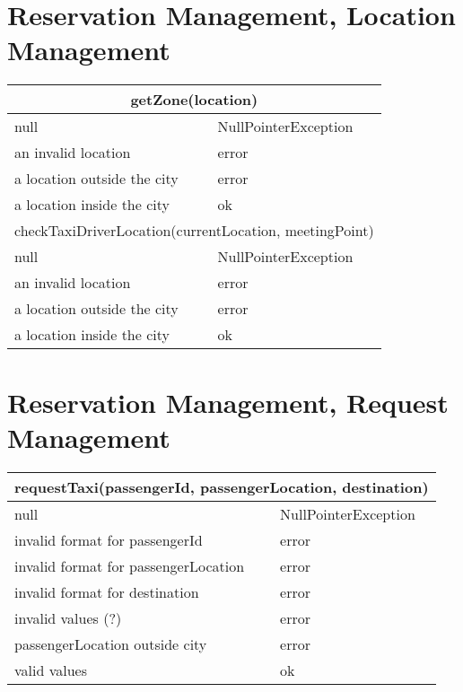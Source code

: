 \documentclass[11pt,oneside,a4paper]{report}
\begin{document}
\section{Reservation Management, Location Management}
\begin{tabular}{p{5cm}|p{6cm}}
\hline
	\multicolumn{2}{c}{getZone(location)}\\\hline
	null &
	NullPointerException \\\hline
	an invalid location &
	error \\\hline
	a location outside the city &
	error \\\hline
	a location inside the city &
	ok \\\hline\hline
		
	\multicolumn{2}{c}{	checkTaxiDriverLocation(currentLocation, meetingPoint)}\\\hline
	null &
	NullPointerException \\\hline
	an invalid location &
	error \\\hline
	a location outside the city &
	error \\\hline
	a location inside the city &
	ok \\\hline
\end{tabular}


\section{Reservation Management, Request Management}
\begin{tabular}{p{5cm}|p{6cm}}
\hline
	\multicolumn{2}{c}{requestTaxi(passengerId, passengerLocation, destination)}\\\hline
	null &
	NullPointerException \\\hline
	invalid format for passengerId &
	error \\\hline
	invalid format for passengerLocation &
	error \\\hline
	invalid format for destination &
	error \\\hline
	invalid values (?) &
	error \\\hline
	passengerLocation outside city &
	error \\\hline
	valid values &
	ok \\\hline\hline
\end{tabular}
\end{document}
